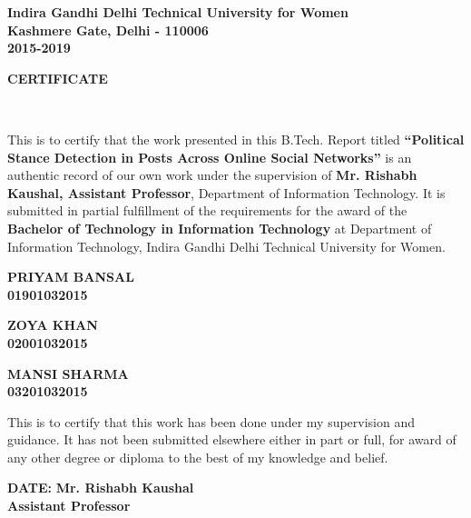 \documentclass[a4paper,11pt]{article}
\begin{document}
\begin{spacing}{1.5}
\begin{center}
{\LARGE \bfseries
Indira Gandhi Delhi Technical University for Women\\
Kashmere Gate, Delhi - 110006\medskip\\
2015-2019
}

\end{center}
\end{spacing}

\newpage
{\LARGE \bfseries CERTIFICATE}
\setcounter{page}{1}
\vspace*{5mm}
\medskip\\
\begin{spacing}{1.5}
This is to certify that the work presented in this B.Tech. Report titled \textbf{“Political Stance Detection in Posts Across Online Social Networks”} is an authentic record of our own work under the supervision of \textbf{Mr. Rishabh Kaushal, Assistant Professor}, Department of Information Technology. It is submitted in partial fulfillment of the requirements for the award of the \textbf{Bachelor of Technology in Information Technology} at Department of Information Technology, Indira Gandhi Delhi Technical University for Women.

\vspace*{1.70cm}
{\hspace*{\fill} {\textbf{PRIYAM BANSAL\\\hspace*{\fill}01901032015}}}

\vspace*{0.05cm}
{\hspace*{\fill} {\textbf{ZOYA KHAN\\\hspace*{\fill}02001032015}}}

\vspace*{0.05cm}
{\hspace*{\fill} {\textbf{MANSI SHARMA\\\hspace*{\fill}03201032015}}}

\vspace*{1.25cm}
{This is to certify that this work has been done under my supervision and guidance. It has not been submitted elsewhere either in part or full, for award of any other degree or diploma to the best of my knowledge and belief.}

\vspace*{2.5cm}
{\textbf{DATE:}\hspace*{\fill} {\textbf{Mr. Rishabh Kaushal\\\hspace*{\fill}Assistant Professor}}}
\end{spacing}
\end{document}
